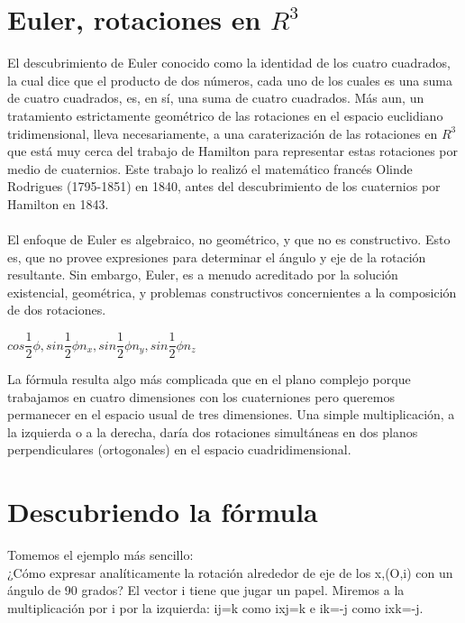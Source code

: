 \documentclass[12pt,a4paper]{report}
\begin{document}
\section{Euler, rotaciones en $R^{3}$}
El descubrimiento de Euler conocido como la identidad de los cuatro cuadrados, la cual dice que el producto de dos números, cada uno de los cuales es una suma de cuatro cuadrados, es, en sí, una suma de cuatro cuadrados.
Más aun, un tratamiento estrictamente geométrico de las rotaciones en el espacio euclidiano tridimensional, lleva necesariamente, a una caraterización de las
rotaciones en $R^{3}$ que está muy cerca del trabajo de Hamilton para representar estas rotaciones por medio de cuaternios. Este trabajo lo realizó el matemático francés Olinde Rodrigues (1795-1851) en 1840, antes del descubrimiento de los cuaternios por Hamilton en 1843.
\\\\El enfoque de Euler es algebraico, no geométrico, y que no es constructivo. Esto es, que no provee expresiones para determinar el ángulo y eje de la rotación resultante. Sin embargo, Euler, es a menudo acreditado por la solución existencial, geométrica, y problemas constructivos concernientes a la composición de dos rotaciones.
\\\begin{center}
$cos\dfrac{1}{2}\phi,sin\dfrac{1}{2}\phi n_{x},sin\dfrac{1}{2}\phi n_{y},sin\dfrac{1}{2}\phi n_{z}$\\\end{center}
La fórmula resulta algo más complicada que en el plano complejo porque trabajamos en cuatro dimensiones con los cuaterniones pero queremos permanecer en el espacio usual de tres dimensiones. Una simple multiplicación, a la izquierda o a la derecha, daría dos rotaciones simultáneas en dos planos perpendiculares (ortogonales) en el espacio cuadridimensional.
\section{Descubriendo la fórmula}
Tomemos el ejemplo más sencillo:\\ ¿Cómo expresar analíticamente la rotación alrededor de eje de los x,(O,i) con un ángulo de 90 grados?
El vector i tiene que jugar un papel. Miremos a la multiplicación por i por la izquierda: ij=k como ixj=k e ik=-j como ixk=-j.
\end{document}
